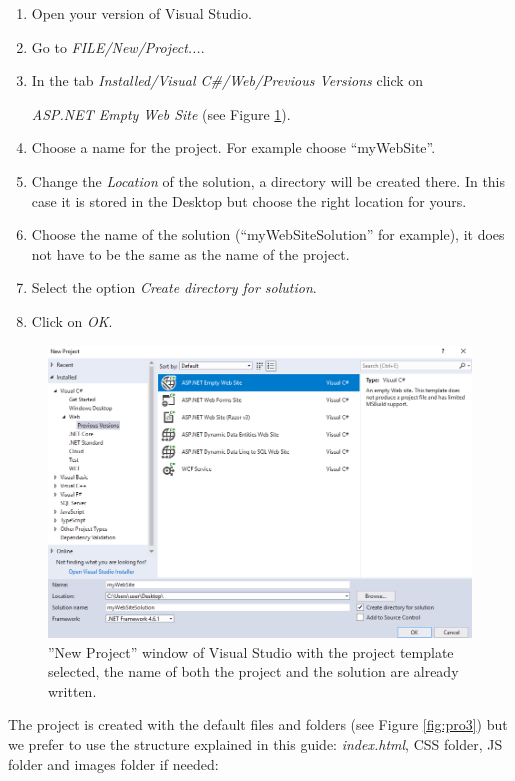 \begin{enumerate}
    \item Open your version of Visual Studio.
    \item Go to \textit{FILE/New/Project...}.
    \item In the tab \textit{Installed/Visual C\#/Web/Previous Versions} click on 
    
    \textit{ASP.NET Empty Web Site} (see Figure \ref{fig:pro2}).
    
    \item Choose a name for the project. For example choose ``myWebSite''.
    \item Change the \textit{Location} of the solution, a directory will be created there. In this case it is stored in the Desktop but choose the right location for yours.
    \item Choose the name of the solution (``myWebSiteSolution'' for example), it does not have to be the same as the name of the project. 
    \item Select the option \textit{Create directory for solution}.
    \item Click on \textit{OK}.
\end{enumerate}

\begin{figure}
    \centering
    \includegraphics[width= 0.9 \textwidth]{Figures/Projects/pro2}
    \caption{''New Project'' window of Visual Studio with the project template selected, the name of both the project and the solution are already written.}
    \label{fig:pro2}
\end{figure}

The project is created with the default files and folders (see Figure \ref{fig:pro3}) but we prefer to use the structure explained in this guide: \textit{index.html}, CSS folder, JS folder and images folder if needed:

